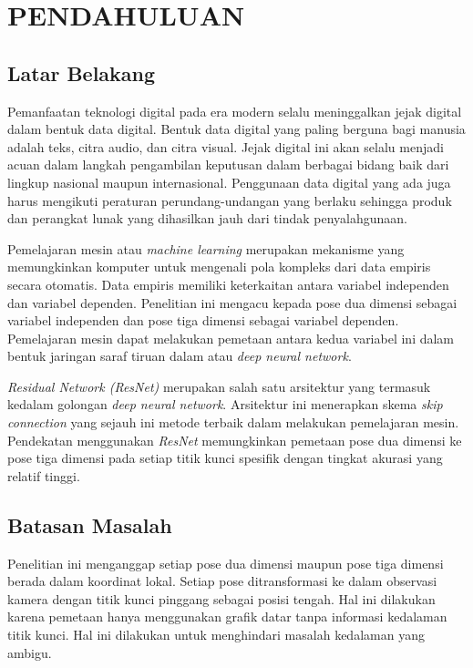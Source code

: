 
\chapter{PENDAHULUAN}
\label{cha:1-Pendahuluan}

\section{Latar Belakang}
\label{sec:1-LatarBelakang}

Pemanfaatan teknologi digital pada era modern selalu meninggalkan jejak digital dalam bentuk data 
digital. Bentuk data digital yang paling berguna bagi manusia adalah teks, citra audio, dan citra 
visual. Jejak digital ini akan selalu menjadi acuan dalam langkah pengambilan keputusan dalam 
berbagai bidang baik dari lingkup nasional maupun internasional. Penggunaan data digital yang ada 
juga harus mengikuti peraturan perundang-undangan yang berlaku sehingga produk dan perangkat lunak 
yang dihasilkan jauh dari tindak penyalahgunaan.

Pemelajaran mesin atau \textit{machine learning} merupakan mekanisme yang memungkinkan komputer 
untuk mengenali pola kompleks dari data empiris secara otomatis. Data empiris memiliki keterkaitan 
antara variabel independen dan variabel dependen. Penelitian ini mengacu kepada pose dua dimensi 
sebagai variabel independen dan pose tiga dimensi sebagai variabel dependen. Pemelajaran mesin 
dapat melakukan pemetaan antara kedua variabel ini dalam bentuk jaringan saraf tiruan dalam atau 
\textit{deep neural network}.

\textit{Residual Network (ResNet)} merupakan salah satu arsitektur yang termasuk kedalam golongan 
\textit{deep neural network}. Arsitektur ini menerapkan skema \textit{skip connection} yang sejauh 
ini metode terbaik dalam melakukan pemelajaran mesin. Pendekatan menggunakan \textit{ResNet} 
memungkinkan pemetaan pose dua dimensi ke pose tiga dimensi pada setiap titik kunci spesifik dengan 
tingkat akurasi yang relatif tinggi.

\section{Batasan Masalah}
\label{sec:1-BatasMasalah}

Penelitian ini menganggap setiap pose dua dimensi maupun pose tiga dimensi berada dalam koordinat 
lokal. Setiap pose ditransformasi ke dalam observasi kamera dengan titik kunci pinggang 
sebagai posisi tengah. Hal ini dilakukan karena pemetaan hanya menggunakan grafik datar tanpa 
informasi kedalaman titik kunci. Hal ini dilakukan untuk menghindari masalah kedalaman yang ambigu. 

